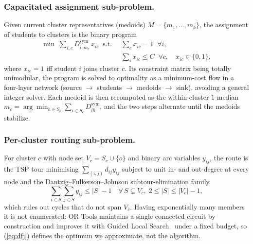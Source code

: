 \documentclass[graybox]{SNmult}
\begin{document}
\subsubsection{Capacitated assignment sub-problem.}
Given current cluster representatives (medoids)
$M=\{m_1,\dots,m_k\}$, the assignment of students to clusters is the
binary program
\begin{align}
\min\; \sum_{i,c} D^{\mathrm{sym}}_{i,m_c}\,x_{ic}
\;\;\text{s.t.}\;\; & \textstyle\sum_{c} x_{ic}=1\;\;\forall i,
\label{eq:assign-obj}\\
& \textstyle\sum_{i} x_{ic}\le C\;\;\forall c,\quad x_{ic}\in\{0,1\},
\label{eq:assign-cap}
\end{align}
where $x_{ic}=1$ iff student $i$ joins cluster $c$. Its constraint matrix
being totally unimodular, the program is solved to optimality as a
minimum-cost flow in a four-layer network (source $\to$ students $\to$
medoids $\to$ sink), avoiding a general integer solver. Each medoid is
then recomputed as the within-cluster $1$-median $m_c=\arg\min_{h\in
S_c}\sum_{i\in S_c} D^{\mathrm{sym}}_{ih}$, and the two steps alternate
until the medoids stabilize.

\subsubsection{Per-cluster routing sub-problem.}
For cluster $c$ with node set $V_c=S_c\cup\{o\}$ and binary arc variables
$y_{ij}$, the route is the TSP tour minimising
$\sum_{(i,j)} d_{ij}y_{ij}$ subject to unit in- and out-degree at every
node and the Dantzig--Fulkerson--Johnson subtour-elimination family
\begin{equation}
\textstyle\sum_{i\in S}\sum_{j\in S} y_{ij}\le |S|-1
  \quad \forall\, S\subsetneq V_c,\; 2\le|S|\le|V_c|-1,
  \label{eq:dfj}
\end{equation}
which rules out cycles that do not span $V_c$. Having exponentially many
members it is not enumerated: OR-Tools maintains a single connected
circuit by construction and improves it with Guided Local
Search~\cite{Voudouris1999GLS} under a fixed budget, so (\ref{eq:dfj})
defines the optimum we approximate, not the algorithm.
\end{document}
